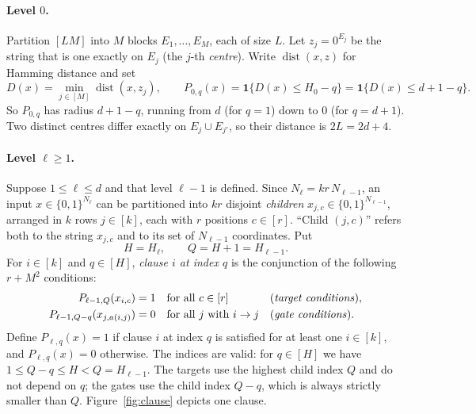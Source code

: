 \documentclass[11pt]{article}
\newcommand{\dist}{\operatorname{dist}}
\theoremstyle{definition}
\theoremstyle{remark}
\begin{document}
\paragraph{Level \(0\).}
Partition \([LM]\) into \(M\) blocks \(E_1,\ldots,E_M\), each of
size \(L\). Let \(z_j=0^{E_j}\) be the string that is one exactly on \(E_j\)
(the \(j\)-th \emph{centre}). Write \(\dist(x,z)\) for Hamming distance and
set
\[
 D(x)=\min_{j\in[M]}\dist(x,z_j),\qquad
 P_{0,q}(x)=\mathbf1\{D(x)\le H_0-q\}=\mathbf1\{D(x)\le d+1-q\}.
\]
So \(P_{0,q}\) has radius \(d+1-q\), running from \(d\) (for \(q=1\)) down to
\(0\) (for \(q=d+1\)). Two distinct centres differ exactly on
\(E_j\cup E_{j'}\), so their distance is \(2L=2d+4\).

\paragraph{Level \(\ell\ge1\).}
Suppose \(1\le\ell\le d\) and that level \(\ell-1\) is defined. Since
\(N_\ell=kr\,N_{\ell-1}\), an input \(x\in\{0,1\}^{N_\ell}\) can be partitioned
into \(kr\) disjoint \emph{children} \(x_{j,c}\in\{0,1\}^{N_{\ell-1}}\),
arranged in \(k\) rows \(j\in[k]\), each with \(r\) positions \(c\in[r]\).
``Child \((j,c)\)'' refers both to the string \(x_{j,c}\) and to its set of
\(N_{\ell-1}\) coordinates. Put
\[
 H=H_\ell,\qquad Q=H+1=H_{\ell-1}.
\]
For \(i\in[k]\) and \(q\in[H]\), \emph{clause \(i\) at index \(q\)} is the
conjunction of the following \(r+M^2\) conditions:
\begin{equation}\label{eq:predicate-definition}
 \begin{aligned}
 P_{\ell-1,Q}(x_{i,c})&=1 &&\text{for all }c\in[r]
   &&\text{(\emph{target conditions})},\\
 P_{\ell-1,Q-q}(x_{j,a(i,j)})&=0 &&\text{for all }j\text{ with }i\to j
   &&\text{(\emph{gate conditions})}.
 \end{aligned}
\end{equation}
Define \(P_{\ell,q}(x)=1\) if clause \(i\) at index \(q\) is satisfied for at
least one \(i\in[k]\), and \(P_{\ell,q}(x)=0\) otherwise. The indices are
valid: for \(q\in[H]\) we have \(1\le Q-q\le H<Q=H_{\ell-1}\). The targets
use the highest child index \(Q\) and do not depend on \(q\); the gates use
the child index \(Q-q\), which is always strictly smaller than \(Q\).
Figure~\ref{fig:clause} depicts one clause.
\end{document}
